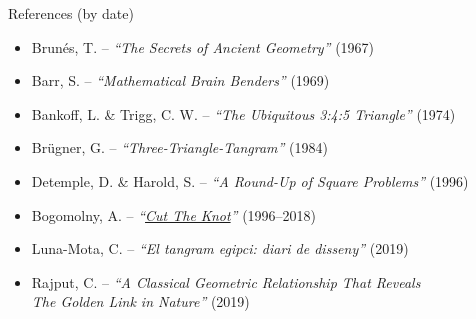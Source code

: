 \documentclass[14pt]{beamer}
\begin{document}

    \begin{frame}{References (by date)}
        \begin{center}
            \bigskip
            {\footnotesize
            \begin{itemize}
                \item Brunés, T. -- \emph{``The Secrets of Ancient Geometry''} (1967)
                \item Barr, S. -- \emph{``Mathematical Brain Benders''} (1969)
                \item Bankoff, L. \& Trigg, C. W. -- \emph{``The Ubiquitous 3:4:5 Triangle''} (1974)
                \item Brügner, G. -- \emph{``Three-Triangle-Tangram''} (1984)
                \item Detemple, D. \& Harold, S. -- \emph{``A Round-Up of Square Problems''} (1996)
                \item Bogomolny, A. -- \emph{``\href{https://www.cut-the-knot.org/}{Cut The Knot}''} (1996--2018)
                \item Luna-Mota, C. -- \emph{``El tangram egipci: diari de disseny''}  (2019)
                \item Rajput, C. -- \emph{``A Classical Geometric Relationship That Reveals\\\qquad\qquad\qquad The Golden Link in Nature''} (2019)
            \end{itemize}}
            \bigskip\bigskip\bigskip\bigskip\bigskip
        \end{center}
    \end{frame}

\end{document}
